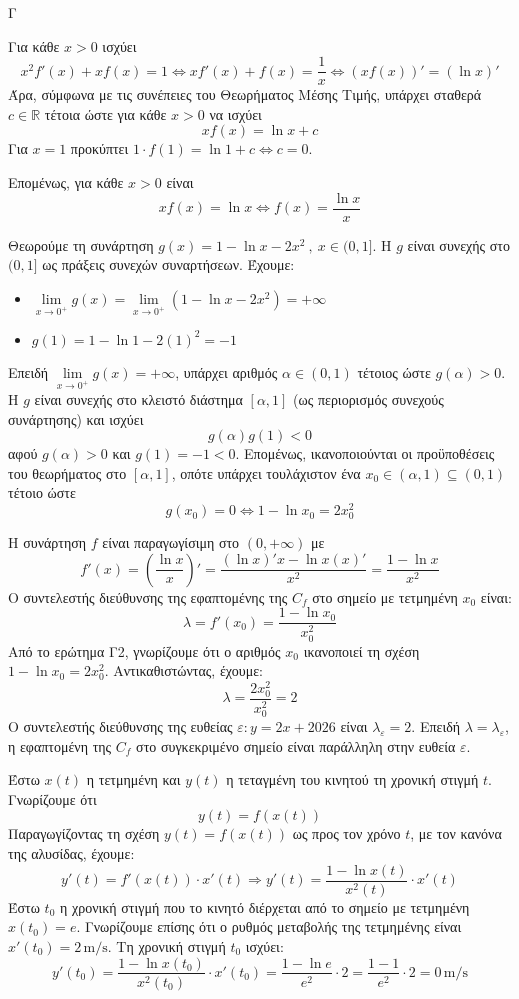 \begin{thema}{Γ}
\begin{erwthma}
\item Για κάθε $x>0$ ισχύει
\[x^2f'(x)+xf(x)=1 \Leftrightarrow x f'(x)+f(x)=\frac{1}{x} \Leftrightarrow (xf(x))'=(\ln x)'\]
Άρα, σύμφωνα με τις συνέπειες του Θεωρήματος Μέσης Τιμής, υπάρχει σταθερά $c \in \mathbb{R}$ τέτοια ώστε για κάθε $x>0$ να ισχύει
\[xf(x)=\ln x + c\]
Για $x=1$ προκύπτει $1\cdot f(1) = \ln 1 + c \Leftrightarrow c = 0$.

Επομένως, για κάθε $x>0$ είναι
\[xf(x)=\ln x  \Leftrightarrow f(x)=\frac{\ln x}{x}\]

\item Θεωρούμε τη συνάρτηση $g(x)=1-\ln x-2x^2\ ,\ x\in(0,1]$.
Η $g$ είναι συνεχής στο $(0,1]$ ως πράξεις συνεχών συναρτήσεων. Έχουμε:
\begin{itemize}
\item $\lim\limits_{x\to 0^+}{g(x)}=\lim\limits_{x\to 0^+}{(1-\ln x-2x^2)}=+\infty$
\item $g(1)=1-\ln 1-2(1)^2=-1$
\end{itemize}
Επειδή $\lim\limits_{x\to 0^+}{g(x)}=+\infty$, υπάρχει αριθμός $\alpha \in (0,1)$ τέτοιος ώστε $g(\alpha)>0$. 
Η $g$ είναι συνεχής στο κλειστό διάστημα $[\alpha, 1]$ (ως περιορισμός συνεχούς συνάρτησης) και ισχύει
\[g(\alpha)g(1) < 0\]
αφού $g(\alpha)>0$ και $g(1)=-1<0$.
Επομένως, ικανοποιούνται οι προϋποθέσεις του θεωρήματος  στο $[\alpha, 1]$, οπότε υπάρχει τουλάχιστον ένα $x_0\in(\alpha,1) \subseteq (0,1)$ τέτοιο ώστε
\[g(x_0)=0 \Leftrightarrow 1-\ln x_0=2x_0^2\]

\item Η συνάρτηση $f$ είναι παραγωγίσιμη στο $(0, +\infty)$ με
\[f'(x) = \left(\frac{\ln x}{x}\right)' = \frac{(\ln x)'x - \ln x(x)'}{x^2} = \frac{1 - \ln x}{x^2}\]
Ο συντελεστής διεύθυνσης της εφαπτομένης της $C_f$ στο σημείο με τετμημένη $x_0$ είναι:
\[\lambda = f'(x_0) = \frac{1 - \ln x_0}{x_0^2}\]
Από το ερώτημα Γ2, γνωρίζουμε ότι ο αριθμός $x_0$ ικανοποιεί τη σχέση $1 - \ln x_0 = 2x_0^2$. Αντικαθιστώντας, έχουμε:
\[\lambda = \frac{2x_0^2}{x_0^2} = 2\]
Ο συντελεστής διεύθυνσης της ευθείας $\varepsilon: y = 2x + 2026$ είναι $\lambda_{\varepsilon} = 2$.
Επειδή $\lambda = \lambda_{\varepsilon}$, η εφαπτομένη της $C_f$ στο συγκεκριμένο σημείο είναι παράλληλη στην ευθεία $\varepsilon$.

\item Έστω $x(t)$ η τετμημένη και $y(t)$ η τεταγμένη του κινητού τη χρονική στιγμή $t$. Γνωρίζουμε ότι
\[y(t)=f(x(t))\]
Παραγωγίζοντας τη σχέση $y(t)=f(x(t))$ ως προς τον χρόνο $t$, με τον κανόνα της αλυσίδας, έχουμε:
\[y'(t)=f'(x(t))\cdot x'(t) \Rightarrow y'(t)=\frac{1-\ln x(t)}{x^2(t)}\cdot x'(t)\]
Έστω $t_0$ η χρονική στιγμή που το κινητό διέρχεται από το σημείο με τετμημένη $x(t_0)=e$. Γνωρίζουμε επίσης ότι ο ρυθμός μεταβολής της τετμημένης είναι $x'(t_0)=2\,\text{m/s}$. Τη χρονική στιγμή $t_0$ ισχύει:
\[y'(t_0)=\frac{1-\ln x(t_0)}{x^2(t_0)}\cdot x'(t_0)=\frac{1-\ln e}{e^2}\cdot 2=\frac{1-1}{e^2}\cdot 2=0\,\text{m/s}\]
\end{erwthma}
\end{thema}

